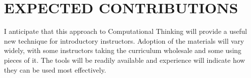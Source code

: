 \documentclass{sig-alternate}
\begin{document}
\section{EXPECTED CONTRIBUTIONS}
I anticipate that this approach to Computational Thinking will provide a useful new technique for introductory instructors. Adoption of the materials will vary widely, with some instructors taking the curriculum wholesale and some using pieces of it. The tools will be readily available and experience will indicate how they can be used most effectively.



\end{document}
